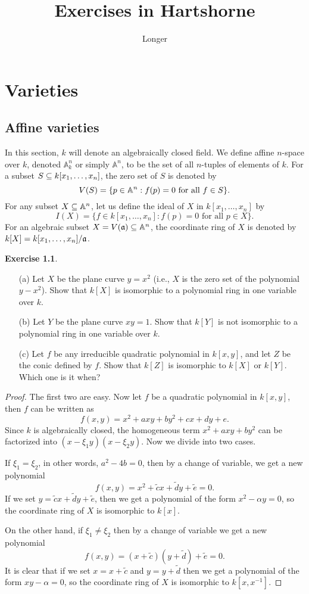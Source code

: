 \documentclass[11pt]{book}
\title{Exercises in Hartshorne}
\author{Longer}
\theoremstyle{definition}
\newtheorem{exercise}{Exercise}[section]
\begin{document}
\maketitle
\tableofcontents
\setlength{\abovedisplayskip}{5pt}
\setlength{\belowdisplayskip}{5pt}
\chapter{Varieties}
\section{Affine varieties}
In this section, $k$ will denote an algebraically closed field. We define affine $n$-space over $k$, denoted $\mathbb{A}^n_k$ or simply $\mathbb{A}^n$, to be the set of all $n$-tuples of elements of $k$. For a subset $S\subseteq k[x_1,\dots,x_n]$, the zero set of $S$ is denoted by
\[V(S)=\{p\in\mathbb{A}^n:\text{$f(p)=0$ for all $f\in S$}\}.\]
For any subset $X\subseteq\mathbb{A}^n$, let us define the ideal of $X$ in $k[x_1,\dots,x_n]$ by
\[I(X)=\{f\in k[x_1,\dots,x_n]:\text{$f(p)=0$ for all $p\in X$}\}.\]
For an algebraic subset $X=V(\mathfrak{a})\subseteq\mathbb{A}^n$, the coordinate ring of $X$ is denoted by $k[X]=k[x_1,\dots,x_n]/\mathfrak{a}$.
\begin{exercise}
\mbox{}
\begin{itemize}
\item[(a)] Let $X$ be the plane curve $y=x^2$ (i.e., $X$ is the zero set of the polynomial $y-x^2$). Show that $k[X]$ is isomorphic to a polynomial ring in one variable over $k$.
\item[(b)] Let $Y$ be the plane curve $xy=1$. Show that $k[Y]$ is not isomorphic to a polynomial ring in one variable over $k$.
\item[(c)] Let $f$ be any irreducible quadratic polynomial in $k[x,y]$, and let $Z$ be the conic defined by $f$. Show that $k[Z]$ is isomorphic to $k[X]$ or $k[Y]$. Which one is it when?
\end{itemize}
\end{exercise}
\begin{proof}
The first two are easy. Now let $f$ be a quadratic polynomial in $k[x,y]$, then $f$ can be written as
\[f(x,y)=x^2+axy+by^2+cx+dy+e.\]
Since $k$ is algebraically closed, the homogeneous term $x^2+axy+by^2$ can be factorized into $(x-\xi_1y)(x-\xi_2y)$. Now we divide into two cases.\par
If $\xi_1=\xi_2$, in other words, $a^2-4b=0$, then by a change of variable, we get a new polynomial
\[f(x,y)=x^2+\tilde{c}x+\tilde{d}y+\tilde{e}=0.\]
If we set $y=\tilde{c}x+\tilde{d}y+\tilde{e}$, then we get a polynomial of the form $x^2-\alpha y=0$, so the coordinate ring of $X$ is isomorphic to $k[x]$.\par
On the other hand, if $\xi_1\neq\xi_2$ then by a change of variable we get a new polynomial
\[f(x,y)=(x+\tilde{c})(y+\tilde{d})+\tilde{e}=0.\]
It is clear that if we set $x=x+\tilde{c}$ and $y=y+\tilde{d}$ then we get a polynomial of the form $xy-\alpha=0$, so the coordinate ring of $X$ is isomorphic to $k[x,x^{-1}]$.\par
\end{proof}
\end{document}

